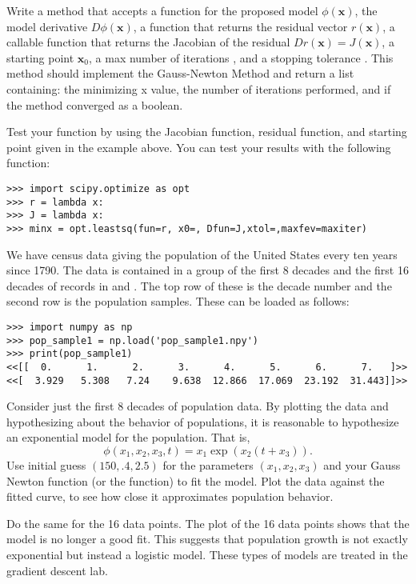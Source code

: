 Write a method that accepts a function for the proposed model $\phi(\mathbf{x})$, the model derivative $D\phi(\mathbf{x})$, a function that returns the residual vector $r(\mathbf{x})$, a callable function that returns the Jacobian of the residual $Dr(\mathbf{x}) = J(\mathbf{x})$, a starting point $\mathbf{x}_0$, a max number of iterations , and a stopping tolerance .
This method should implement the Gauss-Newton Method and return a list containing: the minimizing x value, the number of iterations performed, and if the method converged as a boolean.

Test your function by using the Jacobian function, residual function, and starting point given in the example above.
You can test your results with the following function:
\begin{lstlisting}
>>> import scipy.optimize as opt
>>> r = lambda x:
>>> J = lambda x:
>>> minx = opt.leastsq(fun=r, x0=, Dfun=J,xtol=,maxfev=maxiter)
\end{lstlisting} 

We have census data giving the population of the United States every ten years since 1790.
The data is contained in a group of the first 8 decades and the first 16 decades of records in  and .
The top row of these is the decade number and the second row is the population samples.
These can be loaded as follows:
\begin{lstlisting}
>>> import numpy as np
>>> pop_sample1 = np.load('pop_sample1.npy')
>>> print(pop_sample1)
<<[[  0.      1.      2.      3.      4.      5.      6.      7.   ]>>
<<[  3.929   5.308   7.24    9.638  12.866  17.069  23.192  31.443]]>>
\end{lstlisting}
Consider just the first 8 decades of population data. 
By plotting the data and hypothesizing about the behavior of populations, it is reasonable to hypothesize an exponential model for the population.
That is,
$$
\phi(x_1,x_2,x_3,t) = x_1\exp(x_2(t+x_3)).
$$
Use initial guess $(150, .4, 2.5)$ for the parameters $(x_1, x_2, x_3)$ and your Gauss Newton function (or the  function) to fit the model.
Plot the data against the fitted curve, to see how close it approximates population behavior.

Do the same for the 16 data points.
The plot of the 16 data points shows that the model is no longer a good fit.
This suggests that population growth is not exactly exponential but instead a logistic model.
These types of models are treated in the gradient descent lab.

